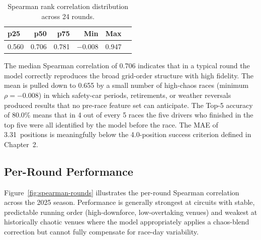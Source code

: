 \documentclass[12pt, a4paper, oneside]{report}
\begin{document}
\begin{table}[H]
\centering
\caption{Spearman rank correlation distribution across 24 rounds.}
\label{tab:spearman-dist}
\begin{tabular}{@{} l r r r r r @{}}
  \toprule
  \textbf{p25} & \textbf{p50} & \textbf{p75} & \textbf{Min} & \textbf{Max} \\
  \midrule
  0.560 & 0.706 & 0.781 & $-0.008$ & 0.947 \\
  \bottomrule
\end{tabular}
\end{table}

The median Spearman correlation of 0.706 indicates that in a typical round the
model correctly reproduces the broad grid-order structure with high fidelity.
The mean is pulled down to 0.655 by a small number of high-chaos races (minimum
$\rho = -0.008$) in which safety-car periods, retirements, or weather reversals
produced results that no pre-race feature set can anticipate. The Top-5 accuracy
of 80.0\% means that in 4 out of every 5 races the five drivers who finished in
the top five were all identified by the model before the race. The MAE of
3.31~positions is meaningfully below the 4.0-position success criterion defined
in Chapter~2.

\subsection{Per-Round Performance}
\label{subsec:per-round}

Figure~\ref{fig:spearman-rounds} illustrates the per-round Spearman correlation
across the 2025 season. Performance is generally strongest at circuits with
stable, predictable running order (high-downforce, low-overtaking venues) and
weakest at historically chaotic venues where the model appropriately applies a
chaos-blend correction but cannot fully compensate for race-day variability.
\end{document}
